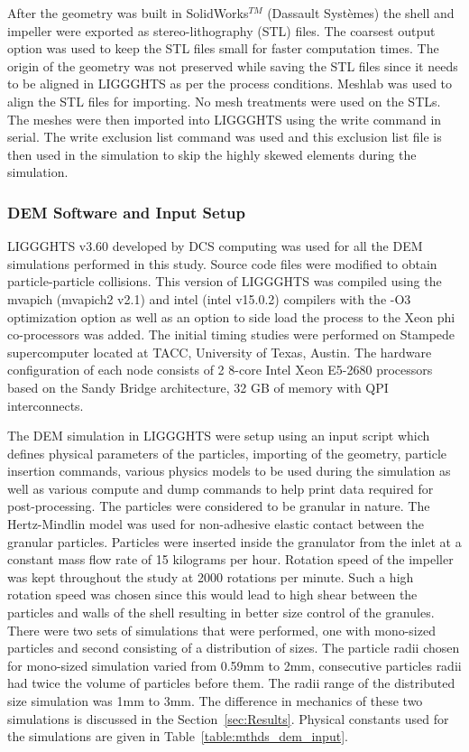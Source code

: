 \documentclass[preprint,11pt,authoryear]{elsarticle}
\begin{document}
After the geometry was built in SolidWorks$^{TM}$ (Dassault Syst\`{e}mes) the shell and impeller 
were exported as stereo-lithography (STL) files. The coarsest output option was used to keep the 
STL files small for faster computation times. The origin of the geometry was not preserved 
while saving the STL files since it needs to be aligned in LIGGGHTS as per the process conditions. 
Meshlab was used to align the STL files for importing. No mesh treatments were used on the STLs. 
The meshes were then imported into LIGGGHTS using the write command in serial. 
The write exclusion list command was used and this exclusion list file is then used in the 
simulation to skip the highly skewed elements during the simulation. 


\subsubsection{DEM Software and Input Setup}
LIGGGHTS v3.60 developed by DCS computing was used for all the DEM simulations 
performed in this study. Source code files were modified to obtain particle-particle 
collisions. This version of LIGGGHTS was compiled using the mvapich (mvapich2 v2.1) 
and intel (intel v15.0.2) compilers with the -O3 optimization option as well as an 
option to side load the process to the Xeon phi co-processors was added. The 
initial timing studies were performed on Stampede supercomputer located at TACC, 
University of Texas, Austin. The hardware configuration of each node consists 
of 2 8-core Intel Xeon E5-2680 processors based on the Sandy Bridge architecture, 
32 GB of memory with QPI interconnects.

The DEM simulation in LIGGGHTS were setup using an input script which defines physical 
parameters of the particles, importing of the geometry, particle insertion commands, various physics 
models to be used during the simulation as well as various compute and dump commands to help print 
data required for post-processing. The particles were considered to be granular in 
nature. The Hertz-Mindlin model was used for non-adhesive elastic contact between 
the granular particles. 
Particles were inserted inside the granulator from the inlet at a constant mass flow rate of 15 
kilograms per hour. Rotation speed of the impeller was kept throughout the study at 2000 rotations 
per minute. Such a high rotation speed was chosen since this would lead to high shear between the 
particles and walls of the shell resulting in better size control of the granules. 
There were two sets of 
simulations that were performed, one with mono-sized particles and second consisting 
of a distribution 
of sizes. The particle radii chosen for mono-sized simulation varied from 0.59mm to 2mm, consecutive 
particles radii had twice the volume of particles before them. The radii range of the distributed 
size simulation was 1mm to 3mm. The difference in mechanics of these two simulations is discussed 
in the Section~\ref{sec:Results}. Physical constants used for the simulations are given in 
Table~\ref{table:mthds_dem_input}.
\end{document}
